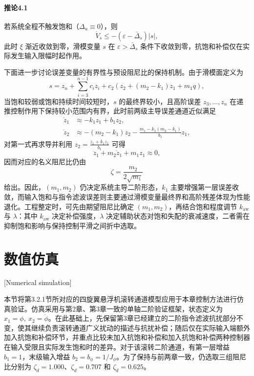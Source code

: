 \paragraph{推论4.1}
若系统全程不触发饱和（$\Delta_u\equiv 0$），则
\begin{equation}
\dot V_s\le -(\varepsilon-\bar\Delta_s)|s|,
\end{equation}
此时 $\xi$ 渐近收敛到零，滑模变量 $s$ 在 $\varepsilon>\bar\Delta_s$ 条件下收敛到零，抗饱和补偿仅在实际发生输入限幅时起作用。

下面进一步讨论误差变量的有界性与预设阻尼比的保持机制。由于滑模面定义为
\begin{equation}
s=z_n+\sum_{i=3}^{n-1}c_i z_i+c_2\left(z_2+(m_2-k_1)z_1+m_1q\right),
\end{equation}
当饱和较弱或饱和持续时间较短时，$s$ 的最终界较小，且高阶误差 $z_3,\ldots,z_n$ 在递推控制作用下保持较小范围内有界，此时前两级主导误差通道近似满足
\begin{subequations}
\begin{align}
\dot z_1&\approx -k_1z_1+b_1z_2,\\
\dot z_2&\approx -(m_2-k_1)z_2-\frac{m_1-k_1(m_2-k_1)}{b_1}z_1,
\end{align}
\end{subequations}
对第一式再求导并利用 $z_2=\frac{\dot z_1+k_1z_1}{b_1}$ 可得
\begin{equation}
\ddot z_1+m_2\dot z_1+m_1z_1\approx 0,
\end{equation}
因而对应的名义阻尼比仍由
\begin{equation}
\zeta = \frac{m_2}{2\sqrt{m_1}}
\end{equation}
给出。因此，$(m_1,m_2)$ 仍决定系统主导二阶形态，$k_1$ 主要增强第一层误差收敛，而输入饱和与指令滤波误差则主要通过滑模变量最终界和高阶残差体现为性能退化。工程整定时，可先由期望阻尼比确定 $(m_1,m_2)$，再结合饱和程度调节 $k_{\mathrm{aw}}$ 与 $\lambda$：其中 $k_{\mathrm{aw}}$ 决定补偿强度，$\lambda$ 决定辅助状态对饱和失配的衰减速度，二者需在抑制饱和影响与保持控制平滑之间折中选取。

\section{数值仿真}[Numerical simulation]

本节将第3.2.1节所对应的四旋翼悬浮机滚转通道模型应用于本章控制方法进行仿真验证。仿真采用与第2章、第3章一致的单轴二阶验证框架，状态定义为 $x_1=\phi,\ x_2=\dot\phi$。在此基础上，先保留第3章已经建立的二阶指令滤波抗扰部分不变，使其继续负责滚转通道广义扰动的描述与抗扰补偿；随后仅在实际输入端额外加入抗饱和补偿环节，并重点比较未加入抗饱和补偿和加入抗饱和补偿两种控制器在输入受限且实际发生饱和时的差异。对于该滚转二阶通道，有第一层增益 $b_1=1$，末级输入增益 $b_2=b_{\phi}=1/J_{\phi}$。为了保持与前两章一致，仍选取三组阻尼比分别为 $\zeta_d=1.000$、$\zeta_d=0.707$ 和 $\zeta_d=0.625$。

